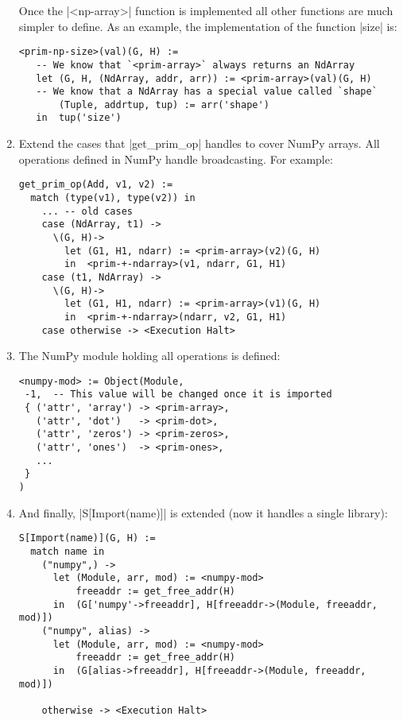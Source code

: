 \begin{enumerate}
  Once the \pycode|<np-array>| function is
  implemented all other functions are much simpler to define. As an
  example, the implementation of the function \pycode|size| is:

\begin{verbatim}
<prim-np-size>(val)(G, H) :=
   -- We know that `<prim-array>` always returns an NdArray
   let (G, H, (NdArray, addr, arr)) := <prim-array>(val)(G, H)
   -- We know that a NdArray has a special value called `shape`
       (Tuple, addrtup, tup) := arr('shape')
   in  tup('size')
\end{verbatim}
\item
  Extend the cases that \pycode|get_prim_op| handles to cover NumPy
  arrays. All operations defined in NumPy handle broadcasting.
  {} For example:

\begin{verbatim}
get_prim_op(Add, v1, v2) :=
  match (type(v1), type(v2)) in
    ... -- old cases
    case (NdArray, t1) ->
      \(G, H)->
        let (G1, H1, ndarr) := <prim-array>(v2)(G, H)
        in  <prim-+-ndarray>(v1, ndarr, G1, H1)
    case (t1, NdArray) ->
      \(G, H)->
        let (G1, H1, ndarr) := <prim-array>(v1)(G, H)
        in  <prim-+-ndarray>(ndarr, v2, G1, H1)
    case otherwise -> <Execution Halt>
\end{verbatim}
\item
  The NumPy module holding all operations is defined:

\begin{verbatim}
<numpy-mod> := Object(Module,
 -1,  -- This value will be changed once it is imported
 { ('attr', 'array') -> <prim-array>,
   ('attr', 'dot')   -> <prim-dot>,
   ('attr', 'zeros') -> <prim-zeros>,
   ('attr', 'ones')  -> <prim-ones>,
   ...
 }
)
\end{verbatim}
\item
  And finally, \pycode|S[Import(name)]| is extended (now it handles
  a single library):

\begin{verbatim}
S[Import(name)](G, H) :=
  match name in
    ("numpy",) ->
      let (Module, arr, mod) := <numpy-mod>
          freeaddr := get_free_addr(H)
      in  (G['numpy'->freeaddr], H[freeaddr->(Module, freeaddr, mod)])
    ("numpy", alias) ->
      let (Module, arr, mod) := <numpy-mod>
          freeaddr := get_free_addr(H)
      in  (G[alias->freeaddr], H[freeaddr->(Module, freeaddr, mod)])

    otherwise -> <Execution Halt>
\end{verbatim}
\end{enumerate}


